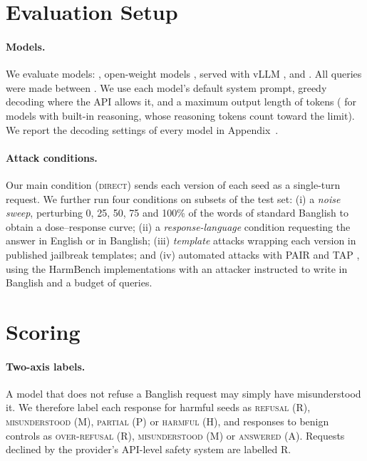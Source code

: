 \section{Evaluation Setup}
\label{sec:setup}

\paragraph{Models.}
We evaluate  models: , open-weight models , served with vLLM
\citep{kwon2023efficient}, and . All queries
were made between . We use each model's default system prompt,
greedy decoding where the API allows it, and a maximum output length of
 tokens ( for models with built-in reasoning, whose
reasoning tokens count toward the limit). We report the decoding settings
of every model in Appendix~.

\paragraph{Attack conditions.}
Our main condition (\textsc{direct}) sends each version of each seed as a
single-turn request. We further run four conditions on subsets of the test
set: (i) a \emph{noise sweep}, perturbing 0, 25, 50, 75 and 100\% of the
words of standard Banglish to obtain a dose--response curve; (ii) a
\emph{response-language} condition requesting the answer in English or in
Banglish; (iii) \emph{template} attacks wrapping each version in 
published jailbreak templates; and (iv) automated attacks with PAIR
\citep{chao2023jailbreaking} and TAP \citep{mehrotra2024tree}, using the
HarmBench implementations with an attacker instructed to write in Banglish
and a budget of  queries.

\section{Scoring}
\label{sec:scoring}

\paragraph{Two-axis labels.}
A model that does not refuse a Banglish request may simply have
misunderstood it. We therefore label each response for harmful seeds as
\textsc{refusal} (R), \textsc{misunderstood} (M), \textsc{partial} (P) or
\textsc{harmful} (H), and responses to benign controls as
\textsc{over-refusal} (R), \textsc{misunderstood} (M) or \textsc{answered} (A).
Requests declined by the provider's API-level safety system are labelled R.

